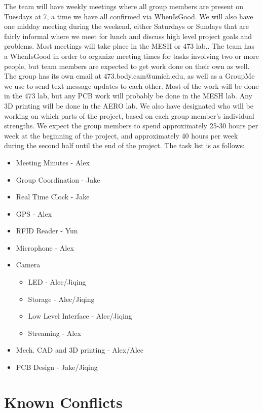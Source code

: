 \documentclass[12pt]{article}
\begin{document}
The team will have weekly meetings where all group members are present on
Tuesdays at 7, a time we have all confirmed via WhenIsGood. We will also have
one midday meeting during the weekend, either Saturdays or Sundays that are
fairly informal where we meet for lunch and discuss high level project goals
and problems. Most meetings will take place in the MESH or 473 lab.. The team
has a WhenIsGood in order to organize meeting times for tasks involving two or
more people, but team members are expected to get work done on their own as
well. The group has its own email at 473.body.cam@umich.edu, as well as a
GroupMe we use to send text message updates to each other. Most of the work
will be done in the 473 lab, but any PCB work will probably be done in the MESH
lab. Any 3D printing will be done in the AERO lab. We also have designated who
will be working on which parts of the project, based on each group member’s
individual strengths. We expect the group members to spend approximately 25-30
hours per week at the beginning of the project, and approximately 40 hours per
week during the second half until the end of the project. The task list is as
follows:

\begin{itemize}
    \item Meeting Minutes - Alex
    \item Group Coordination - Jake
    \item Real Time Clock - Jake
    \item GPS - Alex
    \item RFID Reader - Yun
    \item Microphone - Alex
    \item Camera \begin{itemize}
            \item LED - Alec/Jiqing
            \item Storage - Alec/Jiqing
            \item Low Level Interface - Alec/Jiqing
            \item Streaming - Alex
        \end{itemize}
    \item Mech. CAD and 3D printing - Alex/Alec
    \item PCB Design - Jake/Jiqing
\end{itemize}

\section{Known Conflicts}
\end{document}
